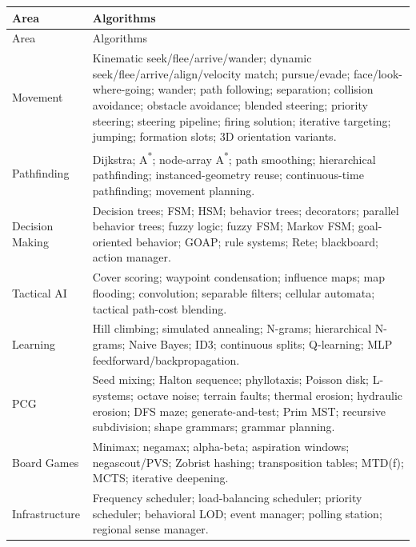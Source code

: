 \documentclass[10pt,letterpaper]{article}
\begin{document}
\begin{longtable}{L{0.24\textwidth}L{0.68\textwidth}}
\toprule
Area & Algorithms \\
\midrule\endfirsthead
\toprule
Area & Algorithms \\
\midrule\endhead
Movement & Kinematic seek/flee/arrive/wander; dynamic seek/flee/arrive/align/velocity match; pursue/evade; face/look-where-going; wander; path following; separation; collision avoidance; obstacle avoidance; blended steering; priority steering; steering pipeline; firing solution; iterative targeting; jumping; formation slots; 3D orientation variants. \\
Pathfinding & Dijkstra; \texorpdfstring{A\textsuperscript{*}}{A*}; node-array \texorpdfstring{A\textsuperscript{*}}{A*}; path smoothing; hierarchical pathfinding; instanced-geometry reuse; continuous-time pathfinding; movement planning. \\
Decision Making & Decision trees; FSM; HSM; behavior trees; decorators; parallel behavior trees; fuzzy logic; fuzzy FSM; Markov FSM; goal-oriented behavior; GOAP; rule systems; Rete; blackboard; action manager. \\
Tactical AI & Cover scoring; waypoint condensation; influence maps; map flooding; convolution; separable filters; cellular automata; tactical path-cost blending. \\
Learning & Hill climbing; simulated annealing; N-grams; hierarchical N-grams; Naive Bayes; ID3; continuous splits; Q-learning; MLP feedforward/backpropagation. \\
PCG & Seed mixing; Halton sequence; phyllotaxis; Poisson disk; L-systems; octave noise; terrain faults; thermal erosion; hydraulic erosion; DFS maze; generate-and-test; Prim MST; recursive subdivision; shape grammars; grammar planning. \\
Board Games & Minimax; negamax; alpha-beta; aspiration windows; negascout/PVS; Zobrist hashing; transposition tables; MTD(f); MCTS; iterative deepening. \\
Infrastructure & Frequency scheduler; load-balancing scheduler; priority scheduler; behavioral LOD; event manager; polling station; regional sense manager. \\
\bottomrule
\end{longtable}

\clearpage
\end{document}
